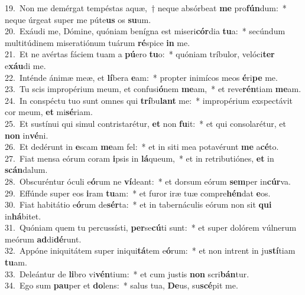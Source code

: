 {19.~}Non me demérgat tempéstas aquæ,~† neque absórbeat \textbf{me} pro\textbf{fún}dum:~* neque úrgeat super me púte\textbf{us} os \textbf{su}um.\\
{20.~}Exáudi me, Dómine, quóniam benígna est miseri\textbf{cór}dia \textbf{tu}a:~* secúndum multitúdinem miseratiónum tuárum \textbf{ré}spice \textbf{in} me.\\
{21.~}Et ne avértas fáciem tuam a \textbf{pú}ero \textbf{tu}o:~* quóniam tríbulor, velóci\textbf{ter} e\textbf{xáu}di me.\\
{22.~}Inténde ánimæ meæ, et \textbf{lí}bera \textbf{e}am:~* propter inimícos meos \textbf{é}ri\textbf{pe} me.\\
{23.~}Tu scis impropérium meum, et confusi\textbf{ó}nem \textbf{me}am,~* et reve\textbf{rén}tiam \textbf{me}am.\\
{24.~}In conspéctu tuo sunt omnes qui \textbf{trí}bu\textbf{lant} me:~* impropérium exspectávit cor meum, \textbf{et} mi\textbf{sé}riam.\\
{25.~}Et sustínui qui simul contristarétur, \textbf{et} non \textbf{fu}it:~* et qui consolarétur, et \textbf{non} in\textbf{vé}ni.\\
{26.~}Et dedérunt in \textbf{e}scam \textbf{me}am fel:~* et in siti mea potavérunt \textbf{me} a\textbf{cé}to.\\
{27.~}Fiat mensa eórum coram \textbf{i}psis in \textbf{lá}queum,~* et in retributiónes, \textbf{et} in \textbf{scán}dalum.\\
{28.~}Obscuréntur óculi e\textbf{ó}rum ne \textbf{ví}deant:~* et dorsum eórum \textbf{sem}per in\textbf{cúr}va.\\
{29.~}Effúnde super eos \textbf{i}ram \textbf{tu}am:~* et furor iræ tuæ compre\textbf{hén}dat \textbf{e}os.\\
{30.~}Fiat habitátio e\textbf{ó}rum de\textbf{sér}ta:~* et in tabernáculis eórum non sit \textbf{qui} in\textbf{há}bitet.\\
{31.~}Quóniam quem tu percussísti, \textbf{per}se\textbf{cú}ti sunt:~* et super dolórem vúlnerum meórum \textbf{ad}di\textbf{dé}runt.\\
{32.~}Appóne iniquitátem super iniqui\textbf{tá}tem e\textbf{ó}rum:~* et non intrent in ju\textbf{stí}tiam \textbf{tu}am.\\
{33.~}Deleántur de \textbf{li}bro vi\textbf{vén}tium:~* et cum justis \textbf{non} scri\textbf{bán}tur.\\
{34.~}Ego sum \textbf{pau}per et \textbf{do}lens:~* salus tua, \textbf{De}us, su\textbf{scé}pit me.\\
